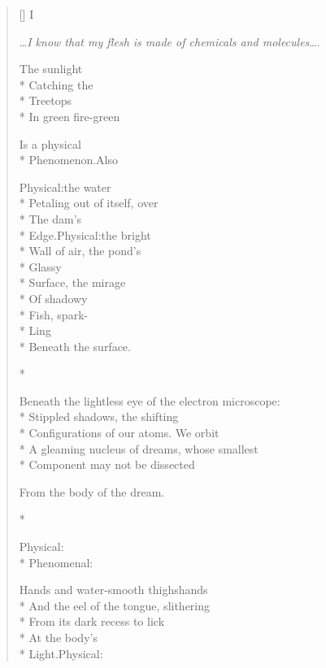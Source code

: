 \begingroup
\setlength\epigraphwidth{9cm}
\setlength\beforeepigraphskip{0cm}
\setlength\afterepigraphskip{0cm}
\newcommand*{\starbreak}{\hspace{0.4\versewidth}*\quad*\quad*}
 
\label{ch:the_body_of_the_dream}
\settowidth{\versewidth}{Vision:\quad the bright wall of my flesh, here, beneath my hand,}
\begin{verse}[\versewidth]
\hspace{0.45\versewidth} I
\epigraph{ \ldots \textit{I know that my flesh is made of chemicals and molecules}\ldots .}{}
The sunlight\\*
Catching the\\*
Treetops\\*
In green fire-green

Is a physical\\*
Phenomenon.\quad Also

Physical:\quad the water\\*
Petaling out of itself, over\\*
The dam's\\*
Edge.\quad Physical:\quad the bright\\*
Wall of air, the pond's\\*
Glassy\\*
Surface,    the mirage\\*
Of shadowy\\*
Fish, spark-\\*
Ling\\*
Beneath the surface.

\starbreak

Beneath the lightless eye of the electron microscope:\\*
Stippled shadows, the shifting\\*
Configurations of our atoms.   We orbit\\*
A gleaming nucleus of dreams, whose smallest\\*
Component may not be dissected

From the body of the dream.

\starbreak

Physical:\\*
Phenomenal:

Hands and water-smooth thighs\quad hands\\*
And the eel of the tongue, slithering\\*
From its dark recess to lick\\*
At the body's\\*
Light.\quad Physical:


\end{verse}
